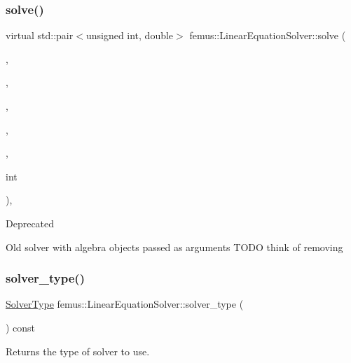 \subsubsection{\texorpdfstring{solve()}{solve()}}
{\footnotesize\ttfamily virtual std\+::pair$<$unsigned int, double$>$ femus\+::\+Linear\+Equation\+Solver\+::solve (\begin{DoxyParamCaption}\item[{\mbox{\hyperlink{classfemus_1_1_sparse_matrix}{Sparse\+Matrix}} \&}]{,  }\item[{\mbox{\hyperlink{classfemus_1_1_sparse_matrix}{Sparse\+Matrix}} \&}]{,  }\item[{\mbox{\hyperlink{classfemus_1_1_numeric_vector}{Numeric\+Vector}} \&}]{,  }\item[{\mbox{\hyperlink{classfemus_1_1_numeric_vector}{Numeric\+Vector}} \&}]{,  }\item[{const double}]{,  }\item[{const unsigned}]{int }\end{DoxyParamCaption})\hspace{0.3cm}{\ttfamily [inline]}, {\ttfamily [virtual]}}

\begin{DoxyRefDesc}{Deprecated}
\item[\mbox{\hyperlink{deprecated__deprecated000001}{Deprecated}}]Old solver with algebra objects passed as arguments T\+O\+DO think of removing \end{DoxyRefDesc}
\mbox{\label{classfemus_1_1_linear_equation_solver_a324c2db823c76cbafd00a94e04c99aad}} 
\subsubsection{\texorpdfstring{solver\+\_\+type()}{solver\_type()}}
{\footnotesize\ttfamily \mbox{\hyperlink{_solvertype_enum_8hpp_a8b06041d7c1fb05f379714f4312306ec}{Solver\+Type}} femus\+::\+Linear\+Equation\+Solver\+::solver\+\_\+type (\begin{DoxyParamCaption}{ }\end{DoxyParamCaption}) const\hspace{0.3cm}{\ttfamily [inline]}}

Returns the type of solver to use. 

